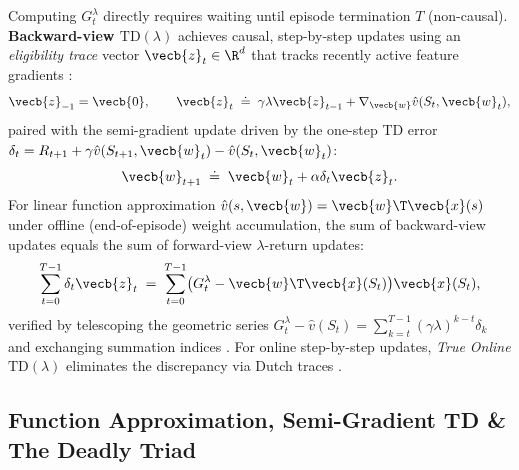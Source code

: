 \documentclass[../../../../master.tex]{subfiles}
\begin{document}
\begin{coremath}
Computing $G_t^\lambda$ directly requires waiting until episode termination $T$ (non-causal). \textbf{Backward-view $\mathrm{TD}(\lambda)$} achieves causal, step-by-step updates using an \emph{eligibility trace} vector $\vecb{z}_t \in \R^d$ that tracks recently active feature gradients :
\begin{equation}
  \vecb{z}_{-1} = \vecb{0}, \qquad \vecb{z}_t \;\doteq\; \gamma \lambda \vecb{z}_{t-1} + \nabla_{\vecb{w}} \hat{v}(S_t, \vecb{w}_t),
  \label{eq:td:eligibility_trace}
\end{equation}
paired with the semi-gradient update driven by the one-step TD error $\delta_t = R_{t+1} + \gamma \hat{v}(S_{t+1}, \vecb{w}_t) - \hat{v}(S_t, \vecb{w}_t)$:
\begin{equation}
  \vecb{w}_{t+1} \;\doteq\; \vecb{w}_t + \alpha \delta_t \vecb{z}_t.
  \label{eq:td:td_lambda_update}
\end{equation}
For linear function approximation $\hat{v}(s, \vecb{w}) = \vecb{w}\T \vecb{x}(s)$ under offline (end-of-episode) weight accumulation, the sum of backward-view updates equals the sum of forward-view $\lambda$-return updates:
\begin{equation}
  \sum_{t=0}^{T-1} \delta_t \vecb{z}_t \;=\; \sum_{t=0}^{T-1} \bigl(G_t^\lambda - \vecb{w}\T \vecb{x}(S_t)\bigr) \vecb{x}(S_t),
\end{equation}
verified by telescoping the geometric series $G_t^\lambda - \hat{v}(S_t) = \sum_{k=t}^{T-1} (\gamma \lambda)^{k-t} \delta_k$ and exchanging summation indices . For online step-by-step updates, \emph{True Online $\mathrm{TD}(\lambda)$} eliminates the discrepancy via Dutch traces .
\end{coremath}

\subsection{Function Approximation, Semi-Gradient TD \& The Deadly Triad}
\end{document}
